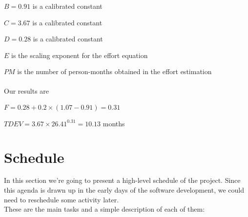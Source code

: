 \documentclass[english]{article}
\begin{document}
$B = 0.91$ is a calibrated constant

$C = 3.67$ is a calibrated constant

$D = 0.28$ is a calibrated constant

$E$ is the scaling exponent for the effort equation

$PM$ is the number of person-months obtained in the effort estimation
\paragraph{}
Our results are
\begin{center}
$F = 0.28 + 0.2 \times (1.07 - 0.91) = 0.31$
\end{center}

\begin{center}
$TDEV = 3.67 \times 26.41^{0.31} = 10.13$ months
\end{center}

\newpage
\section{Schedule}

In this section we're going to present a high-level schedule of the project. Since this agenda is drawn up in the early days of the software development, we could need to reschedule some activity later.\\
These are the main tasks and a simple description of each of them:
\end{document}
